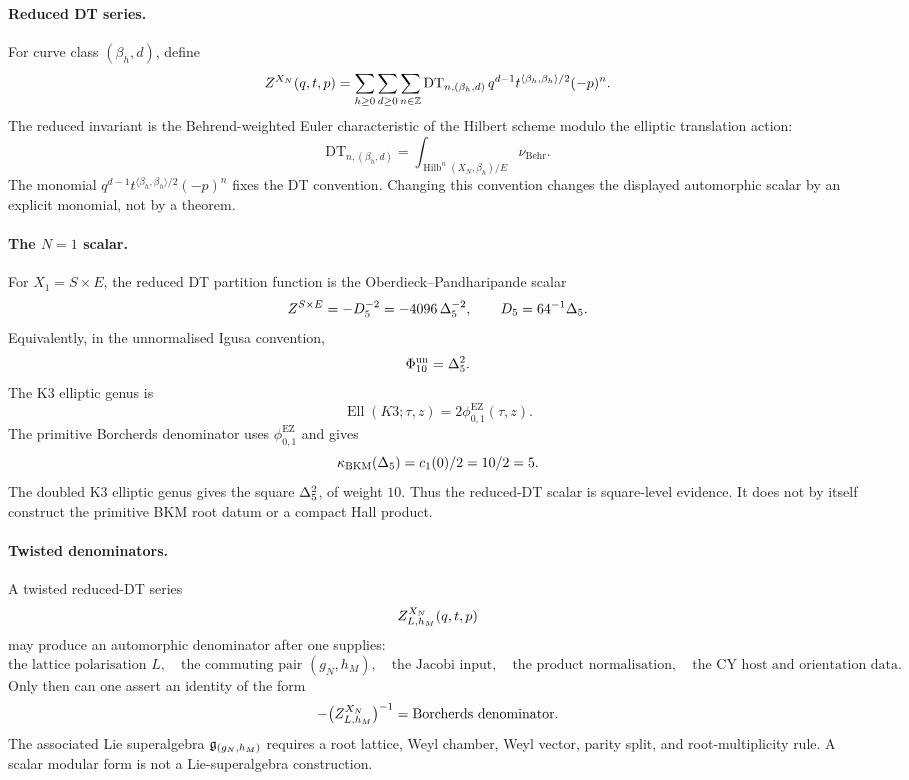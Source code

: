 \paragraph{Reduced DT series.}
For curve class \((\beta_h,d)\), define
\[
  Z^{X_N}(q,t,p)
  =
  \sum_{h\geq0}\sum_{d\geq0}\sum_{n\in\mathbb Z}
  \mathrm{DT}_{n,(\beta_h,d)}\,
  q^{d-1}t^{\langle\beta_h,\beta_h\rangle/2}(-p)^n .
\]
The reduced invariant is the Behrend-weighted Euler characteristic of
the Hilbert scheme modulo the elliptic translation action:
\[
  \mathrm{DT}_{n,(\beta_h,d)}
  =
  \int_{\operatorname{Hilb}^{n}(X_N,\beta_h)/E}\nu_{\mathrm{Behr}} .
\]
The monomial \(q^{d-1}t^{\langle\beta_h,\beta_h\rangle/2}(-p)^n\)
fixes the DT convention. Changing this convention changes the displayed
automorphic scalar by an explicit monomial, not by a theorem.

\paragraph{The \(N=1\) scalar.}
For \(X_1=S\times E\), the reduced DT partition function is the
Oberdieck--Pandharipande scalar
\[
  Z^{S\times E}
  =
  -D_5^{-2}
  =
  -4096\,\Delta_5^{-2},
  \qquad
  D_5=64^{-1}\Delta_5 .
\]
Equivalently, in the unnormalised Igusa convention,
\[
  \Phi_{10}^{\mathrm{un}}=\Delta_5^2 .
\]
The K3 elliptic genus is
\[
  \operatorname{Ell}(K3;\tau,z)=2\phi_{0,1}^{\mathrm{EZ}}(\tau,z).
\]
The primitive Borcherds denominator uses
\(\phi_{0,1}^{\mathrm{EZ}}\) and gives
\[
  \kappa_{\mathrm{BKM}}(\Delta_5)=c_1(0)/2=10/2=5.
\]
The doubled K3 elliptic genus gives the square
\(\Delta_5^2\), of weight \(10\). Thus the reduced-DT scalar is
square-level evidence. It does not by itself construct the primitive
BKM root datum or a compact Hall product.

\paragraph{Twisted denominators.}
A twisted reduced-DT series
\[
  Z^{X_N}_{L,h_M}(q,t,p)
\]
may produce an automorphic denominator after one supplies:
\[
  \text{the lattice polarisation }L,\quad
  \text{the commuting pair }(g_N,h_M),\quad
  \text{the Jacobi input},\quad
  \text{the product normalisation},\quad
  \text{the CY host and orientation data}.
\]
Only then can one assert an identity of the form
\[
  -\bigl(Z^{X_N}_{L,h_M}\bigr)^{-1}
  =
  \text{Borcherds denominator}.
\]
The associated Lie superalgebra
\(\mathfrak{g}_{(g_N,h_M)}\) requires a root lattice, Weyl chamber, Weyl
vector, parity split, and root-multiplicity rule. A scalar modular form
is not a Lie-superalgebra construction.

